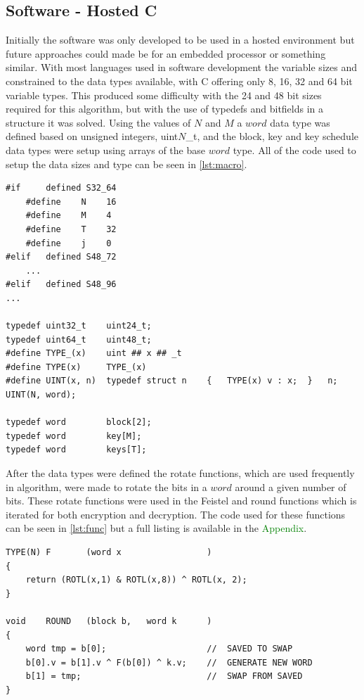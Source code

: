 \documentclass[12pt,twoside,a4paper]{report}
\begin{document}
	\subsection{Software - Hosted C}
	\label{subsection:HOSTED1}
	Initially the software was only developed to be used in a hosted environment but future approaches could made be for an embedded processor or something similar. With most languages used in software development the variable sizes and constrained to the data types available, with C offering only 8, 16, 32 and 64 bit variable types. This produced some difficulty with the 24 and 48 bit sizes required for this algorithm, but with the use of typedefs and bitfields in a structure it was solved. Using the values of $N$ and $M$ a $word$ data type was defined based on unsigned integers, uint$N$\_t, and the block, key and key schedule data types were setup using arrays of the base $word$ type. All of the code used to setup the data sizes and type can be seen in \autoref{lst:macro}.
    
	\begin{lstlisting}[label={lst:macro},caption={Macro definition of the word, block, key and key schedule types.},style=CStyle]
#if		defined	S32_64
    #define    N    16
    #define    M    4
    #define    T    32
    #define    j    0
#elif	defined S48_72
    ...
#elif	defined S48_96
...

typedef uint32_t	uint24_t;
typedef uint64_t	uint48_t;
#define TYPE_(x)	uint ## x ## _t
#define TYPE(x)		TYPE_(x)
#define UINT(x, n)	typedef struct n	{	TYPE(x) v : x;	}	n;
UINT(N, word);

typedef word 		block[2];
typedef word 		key[M];
typedef word		keys[T];
	\end{lstlisting}
    
	After the data types were defined the rotate functions, which are used frequently in algorithm, were made to rotate the bits in a $word$ around a given number of bits. These rotate functions were used in the Feistel and round functions which is iterated for both encryption and decryption. The code used for these functions can be seen in \autoref{lst:func} but a full listing is available in the \textcolor{green}{Appendix}. 
	
	\begin{minipage}{\linewidth}
	\begin{lstlisting}[label={lst:func},caption={Round and Feistel functions},style=CStyle]
TYPE(N)	F		(word x					)
{
	return (ROTL(x,1) & ROTL(x,8)) ^ ROTL(x, 2);
}

void	ROUND	(block b,	word k		)
{	
	word tmp = b[0];					//	SAVED TO SWAP
	b[0].v = b[1].v ^ F(b[0]) ^ k.v;	//	GENERATE NEW WORD
	b[1] = tmp;							//	SWAP FROM SAVED
}
	\end{lstlisting}
	\end{minipage}
	
\end{document}
